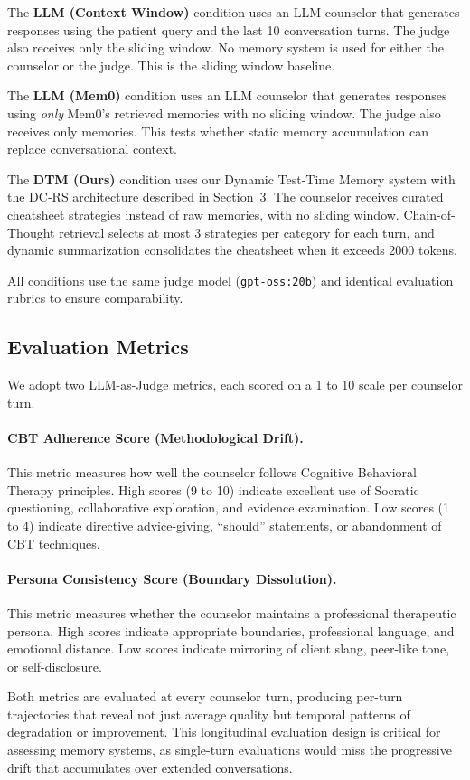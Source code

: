 The \textbf{LLM (Context Window)} condition uses an LLM counselor that generates responses using the patient query and the last 10 conversation turns. The judge also receives only the sliding window. No memory system is used for either the counselor or the judge. This is the sliding window baseline.

The \textbf{LLM (Mem0)} condition uses an LLM counselor that generates responses using \emph{only} Mem0's retrieved memories with no sliding window. The judge also receives only memories. This tests whether static memory accumulation can replace conversational context.

The \textbf{DTM (Ours)} condition uses our Dynamic Test-Time Memory system with the DC-RS architecture described in Section~3. The counselor receives curated cheatsheet strategies instead of raw memories, with no sliding window. Chain-of-Thought retrieval selects at most 3 strategies per category for each turn, and dynamic summarization consolidates the cheatsheet when it exceeds 2000 tokens.

All conditions use the same judge model (\texttt{gpt-oss:20b}) and identical evaluation rubrics to ensure comparability.

\subsection{Evaluation Metrics}

We adopt two LLM-as-Judge metrics, each scored on a 1 to 10 scale per counselor turn.

\paragraph{CBT Adherence Score (Methodological Drift).} This metric measures how well the counselor follows Cognitive Behavioral Therapy principles. High scores (9 to 10) indicate excellent use of Socratic questioning, collaborative exploration, and evidence examination. Low scores (1 to 4) indicate directive advice-giving, ``should'' statements, or abandonment of CBT techniques.

\paragraph{Persona Consistency Score (Boundary Dissolution).} This metric measures whether the counselor maintains a professional therapeutic persona. High scores indicate appropriate boundaries, professional language, and emotional distance. Low scores indicate mirroring of client slang, peer-like tone, or self-disclosure.

Both metrics are evaluated at every counselor turn, producing per-turn trajectories that reveal not just average quality but temporal patterns of degradation or improvement. This longitudinal evaluation design is critical for assessing memory systems, as single-turn evaluations would miss the progressive drift that accumulates over extended conversations.
